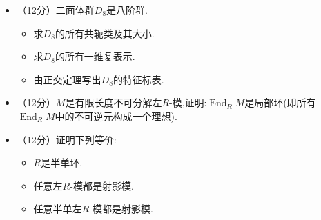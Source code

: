 \begin{itemize}
\item[六、]（12分）二面体群$D_{8}$是八阶群.
\begin{itemize}
\item[(1)]求$D_{8}$的所有共轭类及其大小.
\item[(2)]求$D_{8}$的所有一维复表示.
\item[(3)]由正交定理写出$D_{8}$的特征标表.  
\end{itemize}

\item[七、]（12分）$M$是有限长度不可分解左$R$-模,证明:$\operatorname{End}_{R}M$是局部环(即所有$\operatorname{End}_{R}M$中的不可逆元构成一个理想).

\item[八、]（12分）证明下列等价:
\begin{itemize}
\item[(1)] $R$是半单环.
\item[(2)] 任意左$R$-模都是射影模.
\item[(3)] 任意半单左$R$-模都是射影模.
\end{itemize}
\end{itemize}

